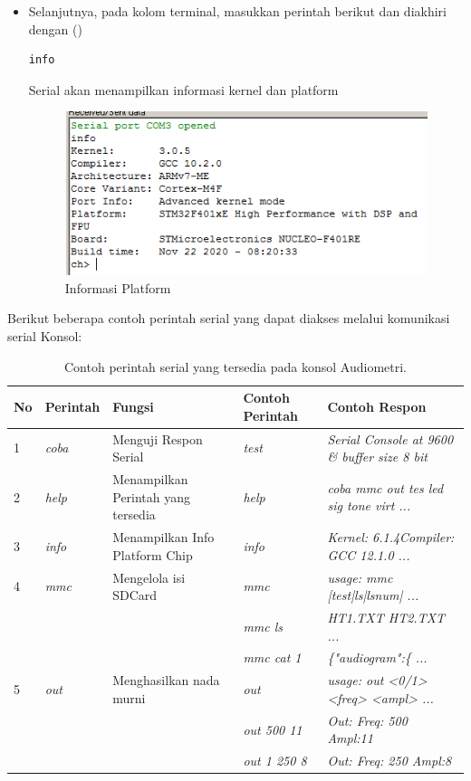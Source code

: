 \documentclass{article}
\begin{document}
\begin{enumerate}
\begin{itemize}
			\item Selanjutnya, pada kolom terminal,
			masukkan perintah berikut dan diakhiri dengan (\keys{\return})
			\begin{verbatim}
info
			\end{verbatim}
			Serial akan menampilkan informasi kernel dan platform
			\begin{figure}[H]
				\centering
				\includegraphics[width=300pt]{images/software/hercules_text}
				\caption{Informasi Platform}
			\end{figure}
		\end{itemize}

	\end{enumerate}

	Berikut beberapa contoh perintah serial yang dapat diakses melalui komunikasi serial Konsol:

	\begin{table}[H]
		\renewcommand{\tablename}{Tabel}
		\centering
		\caption{Contoh perintah serial yang tersedia pada konsol Audiometri. \label{table:serial-code}}
		\begin{tabular}{| p{} | p{} | p{} | p{} | p{} |}
			\hline
			\textbf{No} & \textbf{Perintah} & \textbf{Fungsi} & \textbf{Contoh Perintah} & \textbf{Contoh Respon} \\
			\hline
			1 & \textit{coba} & Menguji Respon Serial & \textit{test} & \textit{Serial Console at 9600 \& buffer size 8 bit} \\
			\hline
			2 & \textit{help} & Menampilkan Perintah yang tersedia & \textit{help} & \textit{coba mmc out tes led sig tone virt ...} \\
			\hline
			3 & \textit{info} & Menampilkan Info Platform Chip & \textit{info} & \textit{Kernel: 6.1.4Compiler: GCC 12.1.0 ...} \\
			\hline
			4 & \textit{mmc} & Mengelola isi SDCard & \textit{mmc} & \textit{usage: mmc [test|ls|lsnum| ...} \\
			& & & \textit{mmc ls} & \textit{HT1.TXT HT2.TXT ...} \\
			& & & \textit{mmc cat 1} & \textit{\{"audiogram":\{ ...} \\
			\hline
			5 & \textit{out} & Menghasilkan nada murni &  \textit{out} & \textit{usage: out <0/1> <freq> <ampl> ...} \\
			& & & \textit{out 500 11} & \textit{Out: Freq:  500 Ampl:11} \\
			& & & \textit{out 1 250 8} & \textit{Out: Freq:  250 Ampl:8} \\
			\hline
		\end{tabular}
	\end{table}
\end{document}
